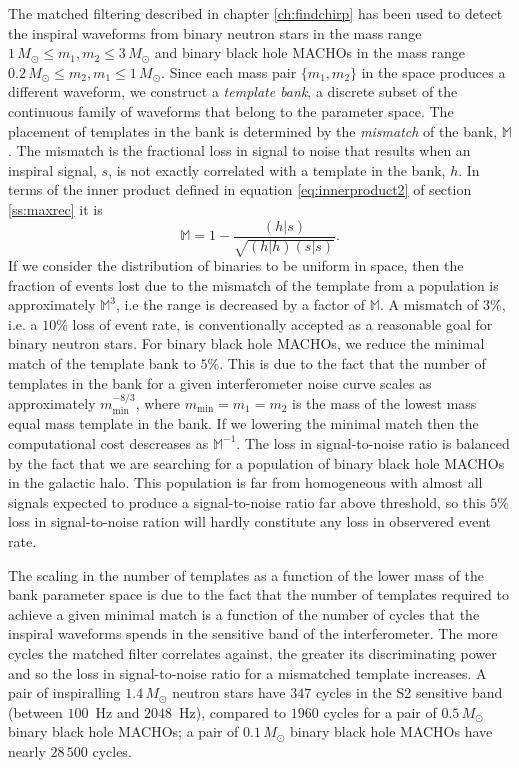 The matched filtering described in chapter \ref{ch:findchirp} has been used to
detect the inspiral waveforms from binary neutron stars in the mass range
$1\,M_\odot\le m_1, m_2\le 3\,M_\odot$ and binary black hole MACHOs in the
mass range $0.2\,M_\odot\le m_2, m_1\le 1\,M_\odot$. Since each mass pair
$\{m_1,m_2\}$ in the space produces a different waveform, we construct a {\em
template bank}, a discrete subset of the continuous family of waveforms that
belong to the parameter space. The placement of templates in the bank is
determined by the \emph{mismatch} of the bank, $\mathbb{M}$. The mismatch is
the fractional loss in signal to noise that results when an inspiral signal,
$s$, is not exactly correlated with a template in the bank, $h$. In terms of
the inner product defined in equation \ref{eq:innerproduct2} of section
\ref{ss:maxrec} it is
\begin{equation}
\mathbb{M} = 1 - \frac{(h|s)} {\sqrt{(h|h)(s|s)}}.
\end{equation}
If we consider the distribution of binaries to be uniform in space, then the
fraction of events lost due to the mismatch of the template from a population
is approximately $\mathbb{M}^3$, i.e the range is decreased by a factor of
$\mathbb{M}$. A mismatch of $3\%$, i.e. a $10\%$ loss of event rate, is
conventionally accepted as a reasonable goal for binary neutron stars. For
binary black hole MACHOs, we reduce the minimal match of the template bank to
$5\%$. This is due to the fact that the number of templates in the bank for a
given interferometer noise curve scales as approximately
$m_\mathrm{min}^{-8/3}$, where $m_\mathrm{min} = m_1 = m_2$ is the mass of the
lowest mass equal mass template in the bank\cite{Owen:1998dk}. If we lowering
the minimal match then the computational cost descreases as $\mathbb{M}^{-1}$.
The loss in signal-to-noise ratio is balanced by the fact that we are
searching for a population of binary black hole MACHOs in the galactic halo.
This population is far from homogeneous with almost all signals expected to
produce a signal-to-noise ratio far above threshold, so this $5\%$ loss in
signal-to-noise ration will hardly constitute any loss in observered event
rate.

The scaling in the number of templates as a function of the lower mass of the
bank parameter space is due to the fact that the number of templates required
to achieve a given minimal match is a function of the number of cycles that the
inspiral waveforms spends in the sensitive band of the interferometer. The
more cycles the matched filter correlates against, the greater its
discriminating power and so the loss in signal-to-noise ratio for a mismatched
template increases. A pair of inspiralling $1.4\,M_\odot$ neutron stars have
$347$ cycles in the S2 sensitive band (between $100$~Hz and $2048$~Hz),
compared to $1960$ cycles for a pair of $0.5\,M_\odot$ binary black hole
MACHOs; a pair of $0.1\,M_\odot$ binary black hole MACHOs have nearly
$28\,500$ cycles.


